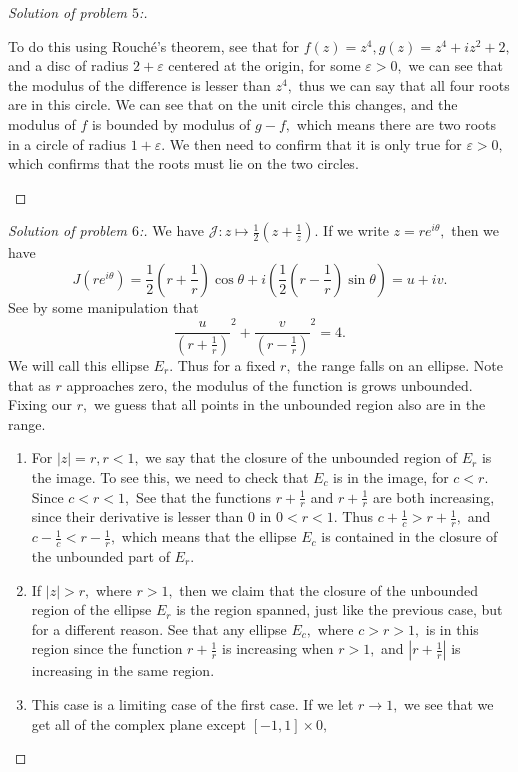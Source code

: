 \documentclass[letterpaper,11pt,twoside]{article}
\theoremstyle{proposition}
\theoremstyle{definition}
\theoremstyle{theorem}
\theoremstyle{definition}
\theoremstyle{definition}
\theoremstyle{definition}
\theoremstyle{lemma}
\theoremstyle{definition}
\theoremstyle{definition}
\theoremstyle{corollary}
\theoremstyle{definition}
\theoremstyle{definition}
\theoremstyle{definition}
\newcommand{\abs}[1]{\left \vert #1 \right \vert}
\begin{document}
\begin{proof}[Solution of problem $5$:]
\begin{enumerate}
	To do this using Rouch\'{e}'s theorem, see that for $f(z)=z^4, g(z)=z^4+iz^2+2,$ and a disc of radius $2+ \varepsilon$ centered at the origin, for some 
	$\varepsilon >0,$ we can see that the modulus of the difference is lesser than $z^4,$ thus we can say that all four roots are in this circle. We can see 
	that on the unit circle this changes, and the modulus of $f$ is bounded by modulus of $g-f,$ which means there are two roots in a circle of radius $1 + 
	\varepsilon$. We then need to confirm that it is only true for $\varepsilon>0,$ which confirms that the roots must lie on the two circles. 
	\end{enumerate}
	\end{proof}
	\begin{proof}[Solution of problem $6$:]
	We have $\mathcal{J}: z \mapsto \frac{1}{2} \left(z+ \frac{1}{z}\right).$ If we write $z=re^{i\theta},$ then we have $$J\left(re^{i\theta}\right)= 
	\frac{1}{2}\left(r + \frac{1}{r}\right)\cos \theta + i \left( \frac{1}{2}\left(r - \frac{1}{r}\right)\sin \theta \right)=u+iv.$$ See by some 
	manipulation that $$\frac{u}{\left(r+ \frac{1}{r}\right)}^2 + \frac{v}{\left(r- \frac{1}{r}\right)}^2 =4.$$ We will call this ellipse $E_r.$ Thus for a 
	fixed $r,$ the range falls on an 
	ellipse. Note that as $r$ approaches zero, the modulus of the function is grows unbounded. Fixing our $r,$ we guess that all points in the unbounded 
	region also are in the range.
	\begin{enumerate}
		\item For $|z| =r, r<1,$ we say that the closure of the unbounded region of $E_r$ is the image. To see this, we need to check that $E_c$ is in the 
		image, for $c < r.$ Since $c<r<1,$ See that the functions $r+ \frac{1}{r}$ and $r+ \frac{1}{r}$ are both increasing, since their derivative is 
		lesser than $0$ in $0 < r < 1.$ Thus $c+ \frac{1}{c} > r+ \frac{1}{r},$ and $c- \frac{1}{c}< r- \frac{1}{r},$ which means that the ellipse $E_c$ is 
		contained in the closure of the unbounded part of $E_r.$ 
		\item If $|z| > r,$ where $r>1,$ then we claim that the closure of the unbounded region of the ellipse $E_r$ is the region spanned, just like the 
		previous case, but for a different reason. See that any ellipse $E_c,$ where $c>r>1,$ is in this region since the function $r+ \frac{1}{r}$ is 
		increasing when $r>1,$ and $\abs{r+ \frac{1}{r}}$ is increasing in the same region.
		\item This case is a limiting case of the first case. If we let $r \to 1,$ we see that we get all of the complex plane except $ [-1 ,1] \times 0,$ 

\end{enumerate}
\end{proof}
\end{document}
